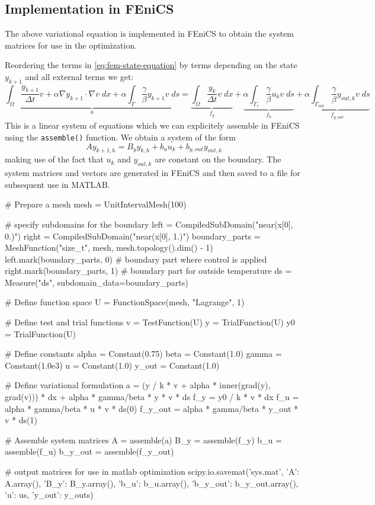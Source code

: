 \documentclass[
12pt, %
a4paper, %
onecolumn, %
portrait %
]{article}
\begin{document}
\subsection{Implementation in FEniCS}
The above variational equation is implemented in FEniCS to obtain the system matrices for use in the optimization.

Reordering the terms in \eqref{eq:fem-state-equation} by terms depending on the state $y_{k+1}$ and all external terms we get:
\begin{equation}
\underbrace{\int_{\Omega} \frac{y_{k+1}}{\Delta t} v + \alpha \nabla y_{k+1} \cdot \nabla v \; dx + \alpha \int_{\Gamma} \frac{\gamma}{\beta}  y_{k+1} v \; ds}_{a} = \underbrace{\int_{\Omega} \frac{y_k}{\Delta t} v \; dx}_{f_y} + \underbrace{\alpha \int_{\Gamma_c} \frac{\gamma}{\beta}  u_k v \; ds}_{f_u}  +  \underbrace{\alpha\int_{\Gamma_{out}} \frac{ \gamma}{\beta}  y_{out,k} v \; ds}_{f_{y,out}}
\end{equation}
This is a linear system of equations which we can explicitely assemble in FEniCS using the \texttt{assemble()} function. We obtain a system of the form
\begin{equation}
A y_{k+1,h} = B_y y_{k,h} + b_u u_k + b_{y,out} y_{out,k}
\end{equation}
making use of the fact that $u_k$ and $y_{out,k}$ are constant on the boundary. The system matrices and vectors are generated in FEniCS and then saved to a file for subsequent use in MATLAB.

\begin{python}
# Prepare a mesh
mesh = UnitIntervalMesh(100)

# specify subdomains for the boundary
left = CompiledSubDomain("near(x[0], 0.)")
right = CompiledSubDomain("near(x[0], 1.)")
boundary_parts = MeshFunction("size_t", mesh, mesh.topology().dim() - 1)
left.mark(boundary_parts, 0)    # boundary part where control is applied
right.mark(boundary_parts, 1)   # boundary part for outside temperature
ds = Measure("ds", subdomain_data=boundary_parts)

# Define function space
U = FunctionSpace(mesh, "Lagrange", 1)

# Define test and trial functions
v = TestFunction(U)
y = TrialFunction(U)
y0 = TrialFunction(U)

# Define constants
alpha = Constant(0.75)
beta = Constant(1.0)
gamma = Constant(1.0e3)
u = Constant(1.0)
y_out = Constant(1.0)

# Define variational formulation
a = (y / k * v + alpha * inner(grad(y), grad(v))) * dx + alpha * gamma/beta * y * v * ds
f_y = y0 / k * v * dx
f_u = alpha * gamma/beta * u * v * ds(0)
f_y_out = alpha * gamma/beta * y_out * v * ds(1)

# Assemble system matrices
A = assemble(a)
B_y = assemble(f_y)
b_u = assemble(f_u)
b_y_out = assemble(f_y_out)

# output matrices for use in matlab optimization
scipy.io.savemat('sys.mat', {'A': A.array(), 'B_y': B_y.array(), 'b_u': b_u.array(), 'b_y_out': b_y_out.array(), 'u': us, 'y_out': y_outs})
\end{python}
\end{document}
